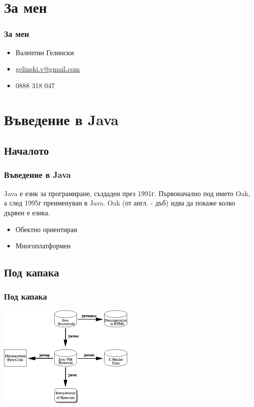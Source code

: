 \documentclass{beamer}
\begin{document}
  \section{За мен}

  \begin{frame}
    \frametitle{За мен}
    \begin{itemize}
      \item{Валентин Гелински}
      \item{\href{mailto:gelinski.v@gmail.com}{gelinski.v@gmail.com}}
      \item{0888 318 047}
    \end{itemize}
  \end{frame}

  \section{Въведение в Java}
  \subsection{Началото}

  \begin{frame}
    \frametitle{Въведение в Java}
    Java е език за програмиране, създаден през 1991г. Първоначално под името Oak, а след 1995г преименуван в Java. Oak (от англ. - дъб) идва да покаже колко дървен е езика.
    \begin{itemize}
      \item{Обектно ориентиран}
      \item{Многоплатформен}
    \end{itemize}
  \end{frame}

  \subsection{Под капака}

  \begin{frame}
    \frametitle{Под капака}
    \includegraphics[width=250px]{img/img34}
  \end{frame}
\end{document}

